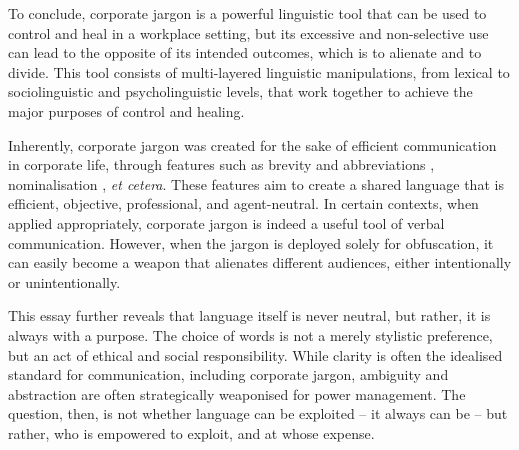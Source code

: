 \documentclass[a4paper,12pt]{article}
\begin{document}
To conclude, corporate jargon is a powerful linguistic tool that can be used to control and heal in a workplace setting, but its excessive and non-selective use can lead to the opposite of its intended outcomes, which is to alienate and to divide.
This tool consists of multi-layered linguistic manipulations, from lexical to sociolinguistic and psycholinguistic levels, that work together to achieve the major purposes of control and healing.

Inherently, corporate jargon was created for the sake of efficient communication in corporate life, through features such as brevity and abbreviations \parencite{Kapralikova2024}, nominalisation \parencite{Bailey1997}, \textit{et cetera}.
These features aim to create a shared language that is efficient, objective, professional, and agent-neutral.
In certain contexts, when applied appropriately, corporate jargon is indeed a useful tool of verbal communication.
However, when the jargon is deployed solely for obfuscation, it can easily become a weapon that alienates different audiences, either intentionally or unintentionally.

This essay further reveals that language itself is never neutral, but rather, it is always with a purpose.
The choice of words is not a merely stylistic preference, but an act of ethical and social responsibility.
While clarity is often the idealised standard for communication, including corporate jargon, ambiguity and abstraction are often strategically weaponised for power management.
The question, then, is not whether language can be exploited -- it always can be -- but rather, who is empowered to exploit, and at whose expense.

\clearpage

\printbibliography
\end{document}
